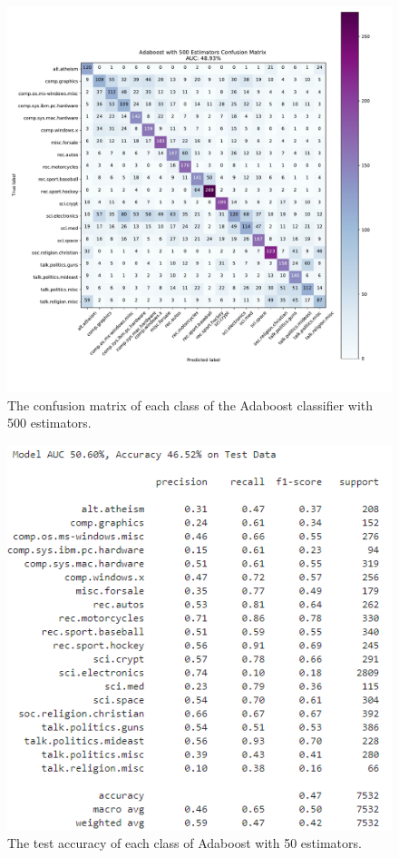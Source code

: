 \documentclass[twocolumn]{extarticle}
\begin{document}
\begin{appendices}
\begin{figure}[H]
\centering
\includegraphics[width=0.9\linewidth]{"charts/Adaboost with 500 Estimators"}
\caption{The confusion matrix of each class of the Adaboost classifier with 500 estimators.}
\label{chart:ada-500-conf}
\end{figure}

\begin{figure}[H]
\centering
\includegraphics[width=0.9\linewidth]{charts/ada-50-acc}
\caption{The test accuracy of each class of Adaboost with 50 estimators.}
\label{chart:ada-50-acc}
\end{figure}


\end{appendices}
\end{document}
